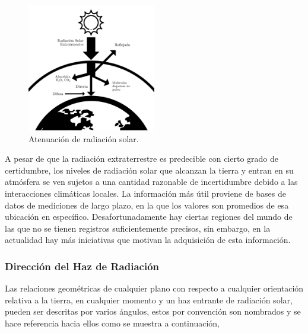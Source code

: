 \begin{figure}[H]
	\centering
	\includegraphics[width=0.5\textwidth, angle=0]{images/attenuationofsolarradiation.pdf}
	\caption{Atenuación de radiación solar.}
\end{figure}

A pesar de que la radiación extraterrestre es predecible con cierto grado de certidumbre, los niveles de radiación solar que alcanzan la tierra y entran en su atmósfera se ven sujetos a una cantidad razonable de incertidumbre debido a las interacciones climáticas locales. La información más útil proviene de bases de datos de mediciones de largo plazo, en la que los valores son promedios de esa ubicación en específico. Desafortunadamente hay ciertas regiones del mundo de las que no se tienen registros suficientemente precisos, sin embargo, en la actualidad hay más iniciativas que motivan la adquisición de esta información.

\subsubsection{Dirección del Haz de Radiación}

Las relaciones geométricas de cualquier plano con respecto a cualquier orientación relativa a la tierra, en cualquier momento y un haz entrante de radiación solar, pueden ser descritas por varios ángulos, estos por convención son nombrados y se hace referencia hacia ellos como se muestra a continuación,

